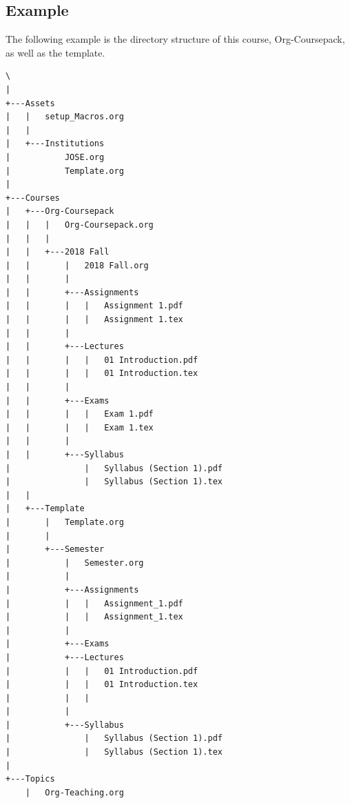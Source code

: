 \documentclass[10pt,article]{article}
\begin{document}
\subsection{Example}
\label{sec:org62a2eb9}
The following example is the directory structure of this course, Org-Coursepack, as well as the template.

{\footnotesize
\begin{verbatim}
\
|
+---Assets
|   |   setup_Macros.org
|   |
|   +---Institutions
|           JOSE.org
|           Template.org
|
+---Courses
|   +---Org-Coursepack
|   |   |   Org-Coursepack.org
|   |   |
|   |   +---2018 Fall
|   |       |   2018 Fall.org
|   |       |
|   |       +---Assignments
|   |       |   |   Assignment 1.pdf
|   |       |   |   Assignment 1.tex
|   |       |
|   |       +---Lectures
|   |       |   |   01 Introduction.pdf
|   |       |   |   01 Introduction.tex
|   |       |
|   |       +---Exams
|   |       |   |   Exam 1.pdf
|   |       |   |   Exam 1.tex
|   |       |
|   |       +---Syllabus
|               |   Syllabus (Section 1).pdf
|               |   Syllabus (Section 1).tex
|   |
|   +---Template
|       |   Template.org
|       |   
|       +---Semester
|           |   Semester.org
|           |   
|           +---Assignments
|           |   |   Assignment_1.pdf
|           |   |   Assignment_1.tex
|           |           
|           +---Exams
|           +---Lectures
|           |   |   01 Introduction.pdf
|           |   |   01 Introduction.tex
|           |   |   
|           |           
|           +---Syllabus
|               |   Syllabus (Section 1).pdf
|               |   Syllabus (Section 1).tex
|
+---Topics
    |   Org-Teaching.org

\end{verbatim}
}
\end{document}
